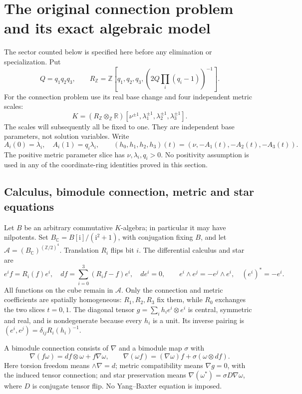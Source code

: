 \documentclass[11pt,a4paper]{article}
\theoremstyle{remark}\newtheorem{remark}[theorem]{Remark}
\begin{document}
\section{The original connection problem and its exact algebraic model}
\label{geometry:model}

The sector counted below is specified here before any elimination or
specialization. Put
\[
 Q=q_1q_2q_3,\qquad
 R_{\mathbb Z}=\mathbb Z[q_1,q_2,q_3,
                 (2Q\textstyle\prod_i(q_i-1))^{-1}].
\]
For the connection problem use its real base change and four independent
metric scales:
\[
 K=(R_{\mathbb Z}\otimes_{\mathbb Z}\mathbb R)
       [\nu^{\pm1},\lambda_1^{\pm1},\lambda_2^{\pm1},\lambda_3^{\pm1}].
\]
The scales will subsequently all be fixed to one. They are independent
base parameters, not solution variables. Write
\[
 A_i(0)=\lambda_i,\quad A_i(1)=q_i\lambda_i,\qquad
 (h_0,h_1,h_2,h_3)(t)
       =(\nu,-A_1(t),-A_2(t),-A_3(t)).
\]
The positive metric parameter slice has
\(\nu,\lambda_i,q_i>0\). No positivity assumption is used in any of the
coordinate-ring identities proved in this section.

\subsection{Calculus, bimodule connection, metric and star equations}

Let \(B\) be an arbitrary commutative \(K\)-algebra; in particular it may
have nilpotents. Set \(B_{\mathbb C}=B[\mathrm i]/(\mathrm i^2+1)\), with
conjugation fixing \(B\), and let
\(\mathcal A=(B_{\mathbb C})^{(\mathbb Z/2)^4}\). Translation \(R_i\)
flips bit \(i\). The differential calculus and star are
\[
 e^if=R_i(f)e^i,\quad
 df=\sum_{i=0}^3(R_i f-f)e^i,\quad de^i=0,\qquad
 e^i\wedge e^j=-e^j\wedge e^i,\quad (e^i)^*=-e^i.
\]
All functions on the cube remain in \(\mathcal A\). Only the connection
and metric coefficients are spatially homogeneous: \(R_1,R_2,R_3\)
fix them, while \(R_0\) exchanges the two slices \(t=0,1\).
The diagonal tensor \(g=\sum_i h_i e^i\otimes e^i\) is central,
symmetric and real, and is nondegenerate because every \(h_i\) is a
unit. Its inverse pairing is
\((e^i,e^j)=\delta_{ij}R_i(h_i)^{-1}\).

A bimodule connection consists of \(\nabla\) and a bimodule map \(\sigma\)
with
\[
 \nabla(f\omega)=df\otimes\omega+f\nabla\omega,\qquad
 \nabla(\omega f)=(\nabla\omega)f+\sigma(\omega\otimes df).
\]
Here torsion freedom means \(\wedge\nabla=d\); metric compatibility
means \(\nabla g=0\), with the induced tensor connection; and star
preservation means \(\nabla(\omega^*)=\sigma D\nabla\omega\), where
\(D\) is conjugate tensor flip. No Yang--Baxter equation is imposed.
\end{document}
